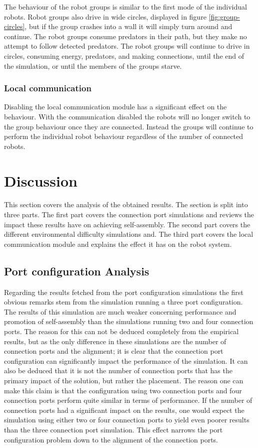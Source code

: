 The behaviour of the robot groups is similar to the first mode of the individual robots.
Robot groups also drive in wide circles, displayed in figure \ref{fig:group-circles}, but if the group crashes into a wall it will simply turn around and continue.
The robot groups consume predators in their path, but they make no attempt to follow detected predators.
The robot groups will continue to drive in circles, consuming energy, predators, and making connections, until the end of the simulation, or until the members of the groups starve.

\subsubsection{Local communication}
\label{sec:disable-local-communication}
Disabling the local communication module has a significant effect on the behaviour.
With the communication disabled the robots will no longer switch to the group behaviour once they are connected.
Instead the groups will continue to perform the individual robot behaviour regardless of the number of connected robots.

\section{Discussion}
This section covers the analysis of the obtained results.
The section is split into three parts.
The first part covers the connection port simulations and reviews the impact these results have on achieving self-assembly.
The second part covers the different environmental difficulty simulations and.
The third part covers the local communication module and explains the effect it has on the robot system.

\subsection{Port configuration Analysis}
Regarding the results fetched from the port configuration simulations the first obvious remarks stem from the simulation running a three port configuration.
The results of this simulation are much weaker concerning performance and promotion of self-assembly than the simulations running two and four connection ports.
The reason for this can not be deduced completely from the empirical results, but as the only difference in these simulations are the number of connection ports and the alignment; it is clear that the connection port configuration can significantly impact the performance of the simulation.
It can also be deduced that it is not the number of connection ports that has the primary impact of the solution, but rather the placement.
The reason one can make this claim is that the configuration using two connection ports and four connection ports perform quite similar in terms of performance.
If the number of connection ports had a significant impact on the results, one would expect the simulation using either two or four connection ports to yield even poorer results than the three connection port simulation.
This effect narrows the port configuration problem down to the alignment of the connection ports.

